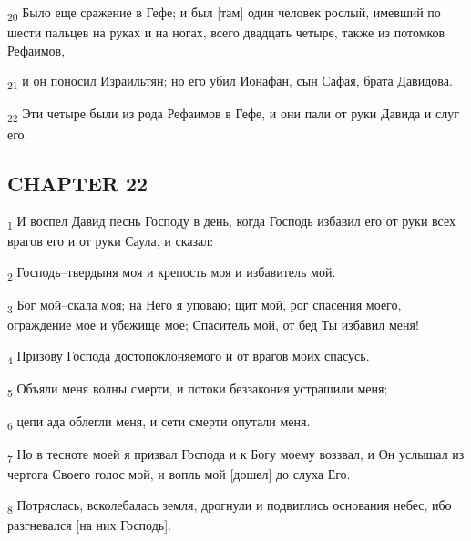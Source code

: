 \begin{tcolorbox}
\textsubscript{20} Было еще сражение в Гефе; и был [там] один человек рослый, имевший по шести пальцев на руках и на ногах, всего двадцать четыре, также из потомков Рефаимов,
\end{tcolorbox}
\begin{tcolorbox}
\textsubscript{21} и он поносил Израильтян; но его убил Ионафан, сын Сафая, брата Давидова.
\end{tcolorbox}
\begin{tcolorbox}
\textsubscript{22} Эти четыре были из рода Рефаимов в Гефе, и они пали от руки Давида и слуг его.
\end{tcolorbox}
\subsection{CHAPTER 22}
\begin{tcolorbox}
\textsubscript{1} И воспел Давид песнь Господу в день, когда Господь избавил его от руки всех врагов его и от руки Саула, и сказал:
\end{tcolorbox}
\begin{tcolorbox}
\textsubscript{2} Господь--твердыня моя и крепость моя и избавитель мой.
\end{tcolorbox}
\begin{tcolorbox}
\textsubscript{3} Бог мой--скала моя; на Него я уповаю; щит мой, рог спасения моего, ограждение мое и убежище мое; Спаситель мой, от бед Ты избавил меня!
\end{tcolorbox}
\begin{tcolorbox}
\textsubscript{4} Призову Господа достопоклоняемого и от врагов моих спасусь.
\end{tcolorbox}
\begin{tcolorbox}
\textsubscript{5} Объяли меня волны смерти, и потоки беззакония устрашили меня;
\end{tcolorbox}
\begin{tcolorbox}
\textsubscript{6} цепи ада облегли меня, и сети смерти опутали меня.
\end{tcolorbox}
\begin{tcolorbox}
\textsubscript{7} Но в тесноте моей я призвал Господа и к Богу моему воззвал, и Он услышал из чертога Своего голос мой, и вопль мой [дошел] до слуха Его.
\end{tcolorbox}
\begin{tcolorbox}
\textsubscript{8} Потряслась, всколебалась земля, дрогнули и подвиглись основания небес, ибо разгневался [на них Господь].
\end{tcolorbox}
